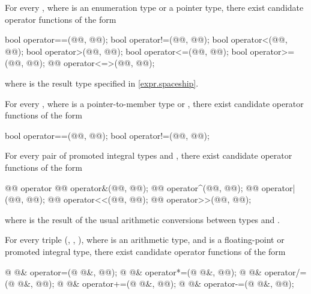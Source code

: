 \pnum
For every , where  is an enumeration type or a pointer type,
there exist candidate operator functions of the form
\begin{codeblock}
bool    operator==(@@, @@);
bool    operator!=(@@, @@);
bool    operator<(@@, @@);
bool    operator>(@@, @@);
bool    operator<=(@@, @@);
bool    operator>=(@@, @@);
@@       operator<=>(@@, @@);
\end{codeblock}
where  is the result type specified in \ref{expr.spaceship}.

\pnum
For every , where 
is a pointer-to-member type or ,
there exist candidate operator functions of the form
\begin{codeblock}
bool operator==(@@, @@);
bool operator!=(@@, @@);
\end{codeblock}

\pnum
For every pair of promoted integral types
and
,
there exist candidate operator functions of the form
\begin{codeblock}
@@      operator%
@@      operator&(@@, @@);
@@      operator^(@@, @@);
@@      operator|(@@, @@);
@@       operator<<(@@, @@);
@@       operator>>(@@, @@);
\end{codeblock}
where
is the result of the usual arithmetic conversions between types
and
.

\pnum
For every triple
(, , ),
where  is an arithmetic type,
and  is a floating-point or promoted integral type,
there exist candidate operator functions of the form
\begin{codeblock}
@ @&   operator=(@ @&, @@);
@ @&   operator*=(@ @&, @@);
@ @&   operator/=(@ @&, @@);
@ @&   operator+=(@ @&, @@);
@ @&   operator-=(@ @&, @@);
\end{codeblock}


